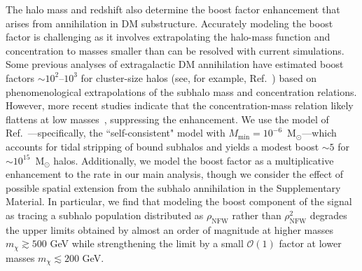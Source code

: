 The halo mass and redshift also determine the boost factor enhancement that arises from annihilation in DM substructure.  Accurately modeling the boost factor is challenging as it involves extrapolating the halo-mass function and concentration to masses smaller than can be resolved with current simulations.  Some previous analyses of extragalactic DM annihilation have estimated boost factors $\sim$$10^2$--$10^3$ for cluster-size halos (see, for example, Ref.~\cite{Gao:2011rf}) based on phenomenological extrapolations of the subhalo mass and concentration relations.  However, more recent studies indicate that the concentration-mass relation likely flattens at low masses~\cite{Anderhalden:2013wd,Ludlow:2013vxa,Correa:2015dva}, suppressing the enhancement. We use the model of Ref.~\cite{Bartels:2015uba}---specifically, the ``self-consistent" model with $M_\text{min} = 10^{-6}$~M$_\odot$---which accounts for tidal stripping of bound subhalos and yields a modest boost $\sim$$5$ for $\sim$$10^{15}$~M$_\odot$ halos. Additionally, we model the boost factor as a multiplicative enhancement to the rate in our main analysis, though we consider the effect of possible spatial extension from the subhalo annihilation in the Supplementary Material. In particular, we find that modeling the boost component of the signal as tracing a subhalo population distributed as $\rho_\text{NFW}$ rather than $\rho^{2}_\text{NFW}$ degrades the upper limits obtained by almost an order of magnitude at higher masses $m_\chi \gtrsim 500$ GeV while strengthening the limit by a small $\mathcal O(1)$ factor at lower masses $m_\chi \lesssim 200$ GeV.

